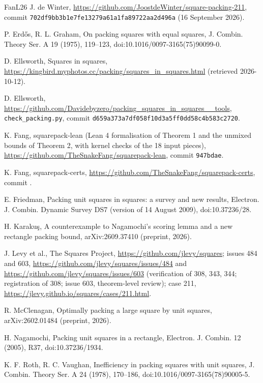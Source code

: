 \documentclass[11pt,letterpaper]{amsart}
\theoremstyle{plain}
\begin{document}
\begin{thebibliography}{FanL26}
 J. de Winter, \url{https://github.com/JoostdeWinter/square-packing-211}, commit \texttt{702df9bb3b1e7fe13279a61a1fa89722aa2d496a} (16 September 2026).

 P. Erd\H{o}s, R. L. Graham, On packing squares with equal squares, J. Combin. Theory Ser. A 19 (1975), 119--123, doi:10.1016/0097-3165(75)90099-0.

 D. Ellsworth, Squares in squares, \url{https://kingbird.myphotos.cc/packing/squares_in_squares.html} (retrieved 2026-10-12).

 D. Ellsworth, \url{https://github.com/Davidebyzero/packing_squares_in_squares__tools}, \texttt{check\_packing.py}, commit \texttt{d659a373a7df058f10d3a5ff0dd58c4b583c2720}.

 K. Fang, squarepack-lean (Lean 4 formalisation of Theorem 1 and the unmixed bounds of Theorem 2, with kernel checks of the 18 input pieces), \url{https://github.com/TheSnakeFang/squarepack-lean}, commit \texttt{947bdae}.

 K. Fang, squarepack-certs, \url{https://github.com/TheSnakeFang/squarepack-certs}, commit .

 E. Friedman, Packing unit squares in squares: a survey and new results, Electron. J. Combin. Dynamic Survey DS7 (version of 14 August 2009), doi:10.37236/28.

 H. Karaku\c{s}, A counterexample to Nagamochi's scoring lemma and a new rectangle packing bound, arXiv:2609.37410 (preprint, 2026).

 J. Levy et al., The Squares Project, \url{https://github.com/jlevy/squares}; issues 484 and 603, \url{https://github.com/jlevy/squares/issues/484} and \url{https://github.com/jlevy/squares/issues/603} (verification of 308, 343, 344; registration of 308; issue 603, theorem-level review); case 211, \url{https://jlevy.github.io/squares/cases/211.html}.

 R. McClenagan, Optimally packing a large square by unit squares, arXiv:2602.01484 (preprint, 2026).

 H. Nagamochi, Packing unit squares in a rectangle, Electron. J. Combin. 12 (2005), R37, doi:10.37236/1934.

 K. F. Roth, R. C. Vaughan, Inefficiency in packing squares with unit squares, J. Combin. Theory Ser. A 24 (1978), 170--186, doi:10.1016/0097-3165(78)90005-5.

\end{thebibliography}
\end{document}
